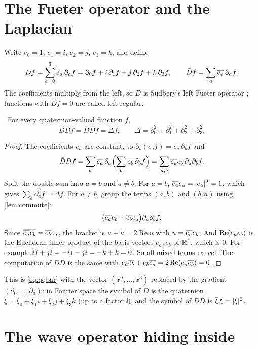 \section{The Fueter operator and the Laplacian}

Write $e_0=1$, $e_1=i$, $e_2=j$, $e_3=k$, and define
\begin{equation}\label{eq:fueter}
Df=\sum_{a=0}^{3}e_a\,\partial_af=\partial_0f+i\,\partial_1f+j\,\partial_2f+k\,\partial_3f,\qquad
\bar Df=\sum_a\overline{e_a}\,\partial_af .
\end{equation}
The coefficients multiply from the left, so $D$ is Sudbery's left Fueter operator \cite{Sudbery1979}; functions with $Df=0$ are called left regular.

\begin{theorem}\label{thm:fueterlap}\ver\
For every quaternion-valued function $f$,
\[
\bar D Df=D\bar Df=\Delta f,\qquad \Delta=\partial_0^2+\partial_1^2+\partial_2^2+\partial_3^2 .
\]
\end{theorem}

\begin{proof}
The coefficients $e_a$ are constant, so $\partial_b(e_af)=e_a\,\partial_bf$ and
\[
\bar DDf=\sum_a\overline{e_a}\,\partial_a\Bigl(\sum_be_b\,\partial_bf\Bigr)=\sum_{a,b}\overline{e_a}e_b\,\partial_a\partial_bf .
\]
Split the double sum into $a=b$ and $a\ne b$. For $a=b$, $\overline{e_a}e_a=|e_a|^2=1$, which gives $\sum_a\partial_a^2f=\Delta f$. For $a\ne b$, group the terms $(a,b)$ and $(b,a)$ using \cref{lem:commute}:
\[
\bigl(\overline{e_a}e_b+\overline{e_b}e_a\bigr)\partial_a\partial_bf .
\]
Since $\overline{\overline{e_a}e_b}=\overline{e_b}e_a$, the bracket is $u+\bar u=2\operatorname{Re}u$ with $u=\overline{e_a}e_b$. And $\operatorname{Re}(\overline{e_a}e_b)$ is the Euclidean inner product of the basis vectors $e_a,e_b$ of $\mathbb{R}^4$, which is $0$. For example $\overline{i}j+\overline{j}i=-ij-ji=-k+k=0$. So all mixed terms cancel. The computation of $D\bar D$ is the same with $e_a\overline{e_b}+e_b\overline{e_a}=2\operatorname{Re}(e_a\overline{e_b})=0$.
\end{proof}

This is \eqref{eq:qqbar} with the vector $(x^0,\dots,x^3)$ replaced by the gradient $(\partial_0,\dots,\partial_3)$: in Fourier space the symbol of $D$ is the quaternion $\xi=\xi_0+\xi_1i+\xi_2j+\xi_3k$ (up to a factor $\ii$), and the symbol of $\bar DD$ is $\overline{\xi}\,\xi=|\xi|^2$.

\section{The wave operator hiding inside}

